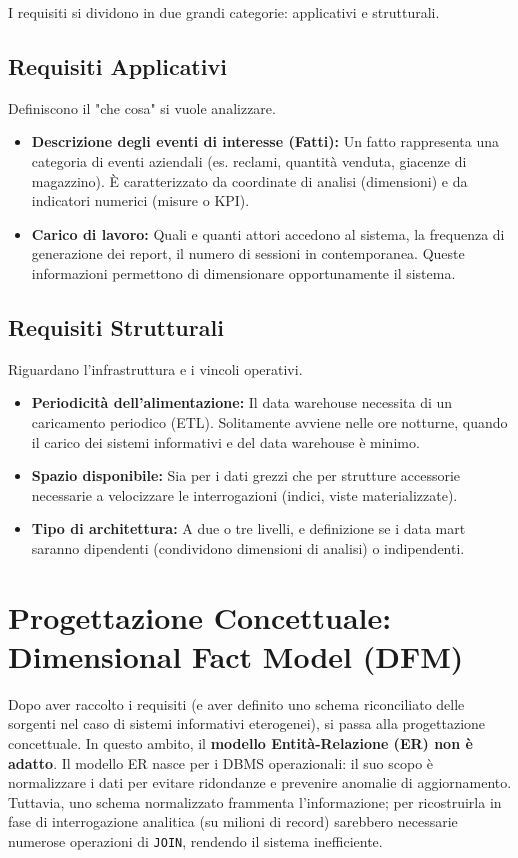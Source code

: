 I requisiti si dividono in due grandi categorie: applicativi e strutturali.

\subsection{Requisiti Applicativi}
Definiscono il "che cosa" si vuole analizzare.
\begin{itemize}
    \item \textbf{Descrizione degli eventi di interesse (Fatti):} Un fatto rappresenta una categoria di eventi aziendali (es. reclami, quantità venduta, giacenze di magazzino). È caratterizzato da coordinate di analisi (dimensioni) e da indicatori numerici (misure o KPI).
    \item \textbf{Carico di lavoro:} Quali e quanti attori accedono al sistema, la frequenza di generazione dei report, il numero di sessioni in contemporanea. Queste informazioni permettono di dimensionare opportunamente il sistema.
\end{itemize}

\subsection{Requisiti Strutturali}
Riguardano l'infrastruttura e i vincoli operativi.
\begin{itemize}
    \item \textbf{Periodicità dell'alimentazione:} Il data warehouse necessita di un caricamento periodico (ETL). Solitamente avviene nelle ore notturne, quando il carico dei sistemi informativi e del data warehouse è minimo.
    \item \textbf{Spazio disponibile:} Sia per i dati grezzi che per strutture accessorie necessarie a velocizzare le interrogazioni (indici, viste materializzate).
    \item \textbf{Tipo di architettura:} A due o tre livelli, e definizione se i data mart saranno dipendenti (condividono dimensioni di analisi) o indipendenti.
\end{itemize}

\section{Progettazione Concettuale: Dimensional Fact Model (DFM)}

Dopo aver raccolto i requisiti (e aver definito uno schema riconciliato delle sorgenti nel caso di sistemi informativi eterogenei), si passa alla progettazione concettuale. In questo ambito, il \textbf{modello Entità-Relazione (ER) non è adatto}.
Il modello ER nasce per i DBMS operazionali: il suo scopo è normalizzare i dati per evitare ridondanze e prevenire anomalie di aggiornamento. Tuttavia, uno schema normalizzato frammenta l'informazione; per ricostruirla in fase di interrogazione analitica (su milioni di record) sarebbero necessarie numerose operazioni di \texttt{JOIN}, rendendo il sistema inefficiente.

